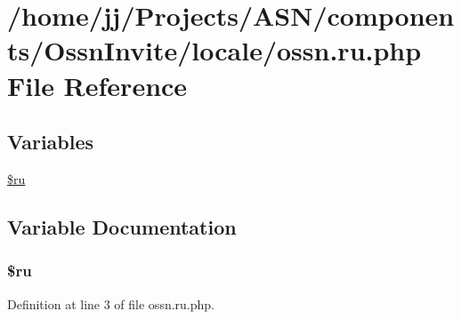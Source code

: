 \hypertarget{components_2_ossn_invite_2locale_2ossn_8ru_8php}{}\section{/home/jj/\+Projects/\+A\+S\+N/components/\+Ossn\+Invite/locale/ossn.ru.\+php File Reference}
\label{components_2_ossn_invite_2locale_2ossn_8ru_8php}
\subsection*{Variables}
\begin{DoxyCompactItemize}
\item 
\hyperlink{components_2_ossn_invite_2locale_2ossn_8ru_8php_aab84a3feda2b0e489cac7cd194e8d726}{\$ru}
\end{DoxyCompactItemize}


\subsection{Variable Documentation}
\subsubsection[{\texorpdfstring{\$ru}{$ru}}]{\setlength{\rightskip}{0pt plus 5cm}\$ru}\hypertarget{components_2_ossn_invite_2locale_2ossn_8ru_8php_aab84a3feda2b0e489cac7cd194e8d726}{}\label{components_2_ossn_invite_2locale_2ossn_8ru_8php_aab84a3feda2b0e489cac7cd194e8d726}


Definition at line 3 of file ossn.\+ru.\+php.


